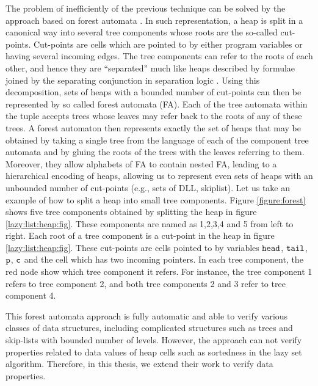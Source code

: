 The problem of inefficiently of the previous technique can be solved by the approach based on forest automata \cite{foresterfull}. In such representation, a heap is split in a canonical way into several tree components whose roots are the so-called cut-points. Cut-points are cells which are pointed to by either program variables or having several incoming edges. The tree components can refer to the roots of each other, and hence they are “separated” much like heaps described by formulae joined by the separating conjunction in separation logic \cite{John:SL}. Using this decomposition, sets of heaps with a bounded number of cut-points can then be represented by so called forest automata (FA). Each of the tree
automata within the tuple accepts trees whose leaves may refer back to the
roots of any of these trees. A forest automaton then represents exactly the set
of heaps that may be obtained by taking a single tree from the language of each
of the component tree automata and by gluing the roots of the trees with the
leaves referring to them. %
 Moreover, they allow alphabets of FA to contain nested FA, leading to a hierarchical encoding of heaps, allowing us to represent even sets of heaps with an unbounded number of cut-points (e.g., sets of DLL, skiplist). 
Let us take an example of how to split a heap into small tree components. Figure \ref{figure:forest} shows five tree components obtained by splitting the heap in figure \ref{lazy:list:heap:fig}. These components are named as 1,2,3,4 and 5 from left to right. Each root of a tree component is a cut-point in the heap in figure \ref{lazy:list:heap:fig}. These cut-points are cells pointed to by variables $\tt head$, $\tt tail$,  $\tt p$,  $\tt c$ and the cell which has two incoming pointers. In each tree component, the red node show which  tree component it refers. For instance, the tree component 1 refers to tree component 2, and both tree components 2 and 3 refer to tree component 4.

This forest automata approach is fully automatic and able to verify various classes of data structures, including complicated structures such as trees and skip-lists with bounded number of levels. 
However, the approach can not verify properties related to data values of heap cells such as sortedness in the lazy set algorithm. Therefore, in this thesis, we extend their work to verify data properties. 

